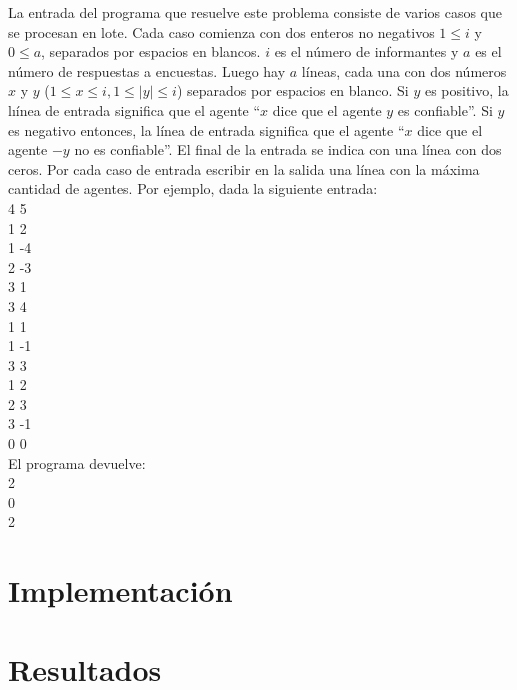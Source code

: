 \documentclass{article}
\begin{document}
La entrada del programa que resuelve este problema consiste de varios casos que se procesan en lote. Cada caso comienza con dos enteros no negativos $1 \leq i$ y $0 \leq a$, separados por espacios en blancos. $i$ es el número de informantes y $a$ es el número de respuestas a encuestas. Luego hay $a$ líneas, cada una con dos números $x$ y $y$ ($1 \leq x \leq i, 1 \leq |y| \leq i$) separados por espacios en blanco. Si $y$ es positivo, la lıínea de entrada significa que el agente “$x$ dice que el agente $y$ es confiable”. Si $y$ es negativo entonces, la línea de entrada significa que el agente “$x$ dice que el agente $-y$ no es confiable”. El final de la entrada se indica con una línea con dos ceros. Por cada caso de entrada escribir en la salida una línea con la máxima cantidad de agentes. Por ejemplo, dada la siguiente entrada: \\
4 5 \\
1 2 \\
1 -4 \\
2 -3 \\
3 1 \\
3 4 \\
1 1 \\
1 -1 \\
3 3 \\
1 2 \\
2 3 \\
3 -1 \\
0 0 \\
El programa devuelve: \\
2 \\
0 \\
2 \\


\section{Implementación}

\section{Resultados}
\end{document}
